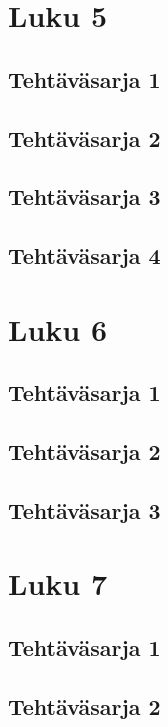 \chapter{Luku 5}
	\section{Tehtäväsarja 1}
		
	\section{Tehtäväsarja 2}
		
	\section{Tehtäväsarja 3}
		
	\section{Tehtäväsarja 4}
		
\chapter{Luku 6}
	\section{Tehtäväsarja 1}
		
	\section{Tehtäväsarja 2}
		
	\section{Tehtäväsarja 3}
		
\chapter{Luku 7}
	\section{Tehtäväsarja 1}
		
	\section{Tehtäväsarja 2}
		
